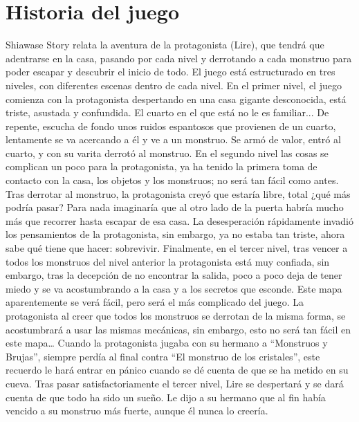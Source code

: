 \section{Historia del juego}
Shiawase Story relata la aventura de la protagonista (Lire), que tendrá que adentrarse en la casa, pasando por cada nivel y derrotando a cada monstruo para poder escapar y descubrir el inicio de todo. El juego está estructurado en tres niveles, con diferentes escenas dentro de cada nivel. \newline
\newline
En el primer nivel, el juego comienza con la protagonista despertando en una casa gigante desconocida, está triste, asustada y confundida. El cuarto en el que está no le es familiar...
\newpage
De repente, escucha de fondo unos ruidos espantosos que provienen de un cuarto, lentamente se va acercando a él y ve a un monstruo. Se armó de valor, entró al cuarto, y con su varita derrotó al monstruo. En el segundo nivel las cosas se complican un poco para la protagonista, ya ha tenido la primera toma de contacto con la casa, los objetos y los monstruos; no será tan fácil como antes.\newline
\newline
Tras derrotar al monstruo, la protagonista creyó que estaría libre, total ¿qué más podría pasar? Para nada imaginaría que al otro lado de la puerta habría mucho más que recorrer hasta escapar de esa casa. La desesperación rápidamente invadió los pensamientos de la protagonista, sin embargo, ya no estaba tan triste, ahora sabe qué tiene que hacer: sobrevivir.\newline
\newline
Finalmente, en el tercer nivel, tras vencer a todos los monstruos del nivel anterior la protagonista está muy confiada, sin embargo, tras la decepción de no encontrar la salida, poco a poco deja de tener miedo y se va acostumbrando a la casa y a los secretos que esconde. Este mapa aparentemente se verá fácil, pero será el más complicado del juego. La protagonista al creer que todos los monstruos se derrotan de la misma forma, se acostumbrará a usar las mismas mecánicas, sin embargo, esto no será tan fácil en este mapa… Cuando la protagonista jugaba con su hermano a “Monstruos y Brujas”, siempre perdía al final contra “El monstruo de los cristales”, este recuerdo le hará entrar en pánico cuando se dé cuenta de que se ha metido en su cueva. Tras pasar satisfactoriamente el tercer nivel, Lire se despertará y se dará cuenta de que todo ha sido un sueño. Le dijo a su hermano que al fin había vencido a su monstruo más fuerte, aunque él nunca lo creería.

